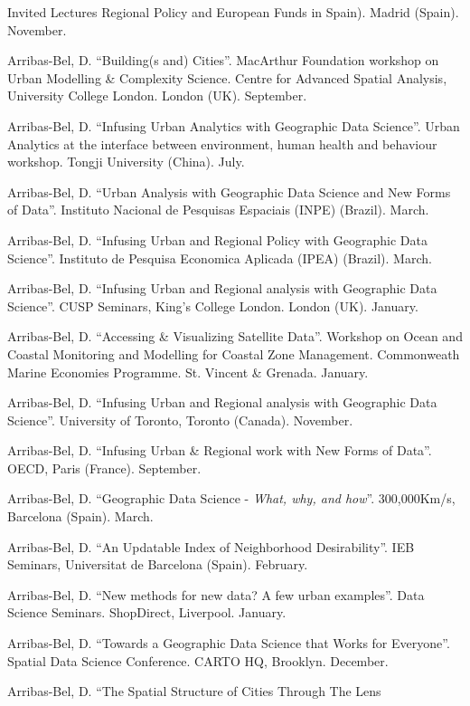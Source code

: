 \documentclass[12pt,2up]{article}
\begin{document}
\begin{cv}{}
\begin{cvlist}{Invited Lectures}
     Regional Policy and European Funds in Spain). Madrid (Spain). November.
 \item[] Arribas-Bel, D. ``Building(s and) Cities''. MacArthur Foundation
     workshop on Urban Modelling \& Complexity Science. Centre for Advanced
     Spatial Analysis, University College London. London (UK). September.
\item[] Arribas-Bel, D. ``Infusing Urban Analytics with Geographic Data
    Science''. Urban Analytics at the interface between environment, human
    health and behaviour workshop. Tongji University (China). July.
\item[] Arribas-Bel, D. ``Urban Analysis with Geographic Data Science and
    New Forms of Data''. Instituto Nacional de Pesquisas Espaciais
    (INPE) (Brazil). March.
\item[] Arribas-Bel, D. ``Infusing Urban and Regional Policy with
    Geographic Data Science''. Instituto de Pesquisa Economica Aplicada
    (IPEA) (Brazil). March.
\item[] Arribas-Bel, D. ``Infusing Urban and Regional analysis
    with Geographic Data Science''. CUSP Seminars, King's College London.
    London (UK). January.
\item[] Arribas-Bel, D. ``Accessing \& Visualizing Satellite Data''. Workshop
    on Ocean and
    Coastal Monitoring and Modelling for Coastal Zone Management. Commonweath
    Marine Economies Programme. St. Vincent \& Grenada. January.
\item[2018] Arribas-Bel, D. ``Infusing Urban and Regional analysis
with Geographic Data Science''. University of Toronto, Toronto (Canada).
November.
\item[] Arribas-Bel, D. ``Infusing Urban \& Regional work with New Forms
    of Data''. OECD, Paris (France). September.
\item[] Arribas-Bel, D. ``Geographic Data Science - \textit{What, why, and
    how}''. 300,000Km/s, Barcelona (Spain). March.
\item[] Arribas-Bel, D. ``An Updatable Index of Neighborhood
    Desirability''. IEB Seminars, Universitat de Barcelona (Spain). February.
\item[] Arribas-Bel, D. ``New methods for new data? A few urban
    examples''. Data Science Seminars. ShopDirect, Liverpool. January.
\item[2017] Arribas-Bel, D. ``Towards a Geographic Data Science that Works for
    Everyone''. Spatial Data Science Conference. CARTO HQ, Brooklyn. December.
\item[] Arribas-Bel, D. ``The Spatial Structure of Cities Through The Lens

\end{cvlist}
\end{cv}
\end{document}
